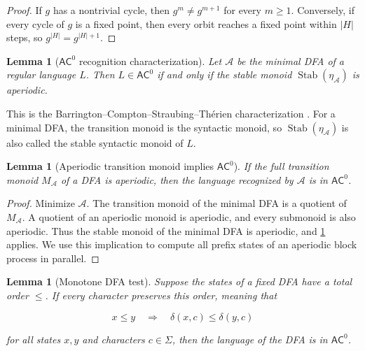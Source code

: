 \documentclass[10pt]{article}
\newtheorem{lemma}[theorem]{Lemma}
\theoremstyle{definition}
\newcommand{\AC}{\mathsf{AC}}
\newcommand{\Stab}{\operatorname{Stab}}
\begin{document}
\begin{proof}
If $g$ has a nontrivial cycle, then $g^m\ne g^{m+1}$ for every $m\ge1$.
Conversely, if every cycle of $g$ is a fixed point, then every orbit reaches a
fixed point within $|H|$ steps, so $g^{|H|}=g^{|H|+1}$.
\end{proof}

\begin{lemma}[$\AC^0$ recognition characterization]
\label{lem:stable-monoid-ac0}
Let $\mathcal A$ be the minimal DFA of a regular language $L$.  Then
$L\in\AC^0$ if and only if the stable monoid
$\Stab(\eta_{\mathcal A})$ is aperiodic.
\end{lemma}

This is the Barrington--Compton--Straubing--Th\'erien characterization
\cite{barrington1992regular}.  For a minimal DFA, the transition monoid is the
syntactic monoid, so $\Stab(\eta_{\mathcal A})$ is also called the stable
syntactic monoid of $L$.

\begin{lemma}[Aperiodic transition monoid implies $\AC^0$]
\label{lem:aperiodic-ac0}
If the full transition monoid $M_{\mathcal A}$ of a DFA is aperiodic, then the
language recognized by $\mathcal A$ is in $\AC^0$.
\end{lemma}

\begin{proof}
Minimize $\mathcal A$.  The transition monoid of the minimal DFA is a quotient
of $M_{\mathcal A}$.  A quotient of an aperiodic monoid is aperiodic, and
every submonoid is also aperiodic.  Thus the stable monoid of the minimal DFA
is aperiodic, and \cref{lem:stable-monoid-ac0} applies.  We use this implication
to compute all prefix states of an aperiodic block process in parallel.
\end{proof}

\begin{lemma}[Monotone DFA test]
\label{lem:monotone-ac0}
Suppose the states of a fixed DFA have a total order $\le$.  If every
character preserves this order, meaning that

\begin{equation}
 x\le y
 \quad\Longrightarrow\quad
 \delta(x,c)\le\delta(y,c)
\end{equation}

for all states $x,y$ and characters $c\in\Sigma$, then the language of the DFA
is in $\AC^0$.
\end{lemma}
\end{document}
